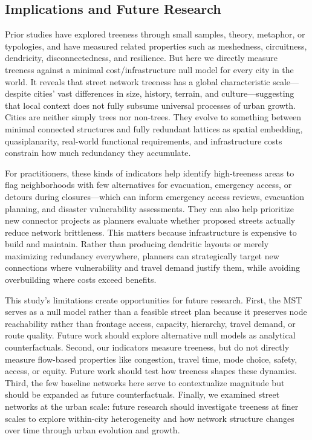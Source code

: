 \documentclass[12pt,letterpaper]{article} %
\begin{document}
\subsection{Implications and Future Research}

Prior studies have explored treeness through small samples, theory, metaphor, or typologies, and have measured related properties such as meshedness, circuitness, dendricity, disconnectedness, and resilience. But here we directly measure treeness against a minimal cost/infrastructure null model for every city in the world. It reveals that street network treeness has a global characteristic scale---despite cities' vast differences in size, history, terrain, and culture---suggesting that local context does not fully subsume universal processes of urban growth. Cities are neither simply trees nor non-trees. They evolve to something between minimal connected structures and fully redundant lattices as spatial embedding, quasiplanarity, real-world functional requirements, and infrastructure costs constrain how much redundancy they accumulate.

For practitioners, these kinds of indicators help identify high-treeness areas to flag neighborhoods with few alternatives for evacuation, emergency access, or detours during closures---which can inform emergency access reviews, evacuation planning, and disaster vulnerability assessments. They can also help prioritize new connector projects as planners evaluate whether proposed streets actually reduce network brittleness. This matters because infrastructure is expensive to build and maintain. Rather than producing dendritic layouts or merely maximizing redundancy everywhere, planners can strategically target new connections where vulnerability and travel demand justify them, while avoiding overbuilding where costs exceed benefits.

This study's limitations create opportunities for future research. First, the MST serves as a null model rather than a feasible street plan because it preserves node reachability rather than frontage access, capacity, hierarchy, travel demand, or route quality. Future work should explore alternative null models as analytical counterfactuals. Second, our indicators measure treeness, but do not directly measure flow-based properties like congestion, travel time, mode choice, safety, access, or equity. Future work should test how treeness shapes these dynamics. Third, the few baseline networks here serve to contextualize magnitude but should be expanded as future counterfactuals. Finally, we examined street networks at the urban scale: future research should investigate treeness at finer scales to explore within-city heterogeneity and how network structure changes over time through urban evolution and growth.
\end{document}
